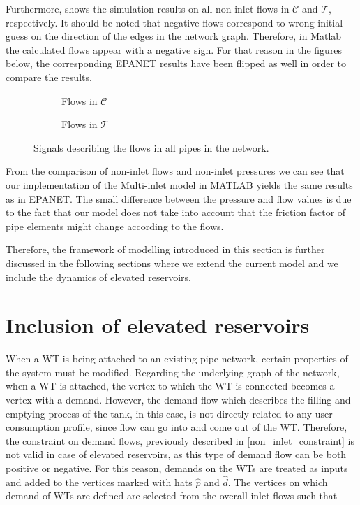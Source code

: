 Furthermore,  shows the simulation results on all non-inlet flows in $\mathcal{C}$ and $\mathcal{T}$, respectively. It should be noted that negative flows correspond to wrong initial guess on the direction of the edges in the network graph. Therefore, in Matlab the calculated flows appear with a negative sign. For that reason in the figures below, the corresponding EPANET results have been flipped as well in order to compare the results. 

\begin{figure}[H]
\centering
\begin{subfigure}{.49\textwidth}
\centering
   
  \caption{Flows in $\mathcal{C}$}
  \label{fig:sub31_example1}
\end{subfigure}
\begin{subfigure}{.49\textwidth}
\centering
   
  \caption{Flows in $\mathcal{T}$}
  \label{fig:sub31_example1}
\end{subfigure}
\caption{Signals describing the flows in all pipes in the network.}
\label{fig:flows_C_T}
\end{figure}
\vspace{-3mm}

From the comparison of non-inlet flows and non-inlet pressures we can see that our implementation of the Multi-inlet model in MATLAB yields the same results as in EPANET. The small difference between the pressure and flow values is due to the fact that our model does not take into account that the friction factor of pipe elements might change according to the flows.  

Therefore, the framework of modelling introduced in this section is further discussed in the following sections where we extend the current model and we include the dynamics of elevated reservoirs. 

\newpage

\section{Inclusion of elevated reservoirs}
\label{inclusion_of_reservoirs}

When a WT is being attached to an existing pipe network, certain properties of the system must be modified. Regarding the underlying graph of the network, when a WT is attached, the vertex to which the WT is connected becomes a vertex with a demand. However, the demand flow which describes the filling and emptying process of the tank, in this case, is not directly related to any user consumption profile, since flow can go into and come out of the WT. Therefore, the constraint on demand flows, previously described in \eqref{non_inlet_constraint} is not valid in case of elevated reservoirs, as this type of demand flow can be both positive or negative. For this reason, demands on the WTs are treated as inputs and added to the vertices marked with hats $\hat{p}$ and $\hat{d}$. The vertices on which demand of WTs are defined are selected from the overall inlet flows such that 

